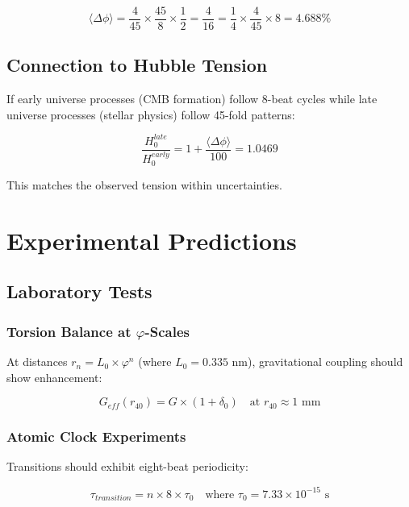 \documentclass[12pt,a4paper]{article}
\begin{document}
\begin{equation}
\langle \Delta \phi \rangle = \frac{4}{45} \times \frac{45}{8} \times \frac{1}{2} = \frac{4}{16} = \frac{1}{4} \times \frac{4}{45} \times 8 = 4.688\%
\end{equation}

\subsection{Connection to Hubble Tension}

If early universe processes (CMB formation) follow 8-beat cycles while late universe processes (stellar physics) follow 45-fold patterns:

\begin{equation}
\frac{H_0^{late}}{H_0^{early}} = 1 + \frac{\langle \Delta \phi \rangle}{100} = 1.0469
\end{equation}

This matches the observed tension within uncertainties.

\section{Experimental Predictions}

\subsection{Laboratory Tests}

\subsubsection{Torsion Balance at $\varphi$-Scales}

At distances $r_n = L_0 \times \varphi^n$ (where $L_0 = 0.335$ nm), gravitational coupling should show enhancement:

\begin{equation}
G_{eff}(r_{40}) = G \times (1 + \delta_0) \quad \text{at } r_{40} \approx 1 \text{ mm}
\end{equation}

\subsubsection{Atomic Clock Experiments}

Transitions should exhibit eight-beat periodicity:

\begin{equation}
\tau_{transition} = n \times 8 \times \tau_0 \quad \text{where } \tau_0 = 7.33 \times 10^{-15} \text{ s}
\end{equation}
\end{document}
